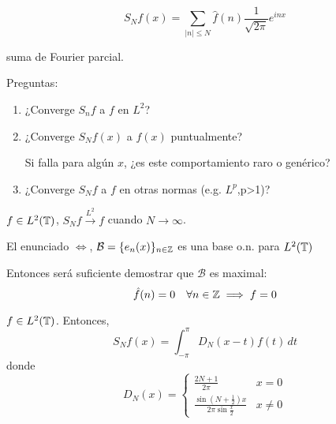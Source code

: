 \[S_N f(x)=\sum_{|n|\leq N} \hat f(n)\frac{1}{\sqrt{2\pi}} e^{inx}\]

suma de Fourier parcial.

Preguntas:

\begin{enumerate}
    \item ¿Converge $S_n f$ a $f$ en $L^2$?
    \item ¿Converge $S_N f(x)$ a $f(x)$ puntualmente?
    
    Si falla para algún $x$, ¿es este comportamiento raro o genérico?

    \item ¿Converge $S_N f$ a $f$ en otras normas (e.g. $L^p$,p>1)?
\end{enumerate}

\begin{ftheorem}
    $f\in L^2(\mathbb{T})$, $S_N f\xrightarrow{L^2}f$ cuando $N\to\infty$.
\end{ftheorem}

\begin{fnote}
    El enunciado $\iff$,  $\mathcal{B}=\{e_n(x)\}_{n\in\mathbb{Z}}$ es una base o.n. para $L^2(\mathbb{T})$
\end{fnote}

    Entonces será suficiente demostrar que $\mathcal{B}$ es maximal:
    \[\hat f(n)=0\quad\forall n\in\mathbb{Z}\implies f=0\]


\begin{ftheorem}
    $f\in L^2(\mathbb{T})$. Entonces, 
    \[S_N f(x)=\int_{-\pi}^\pi D_N(x-t)f(t)\,dt\]
    donde 
    \[D_N(x)=\begin{cases}
        \frac{2N+1}{2\pi}& x=0\\
        \frac{\sin(N+\frac{1}{2})x}{2\pi\sin \frac{x}{2}}&x\neq 0
    \end{cases}\]
\end{ftheorem}

